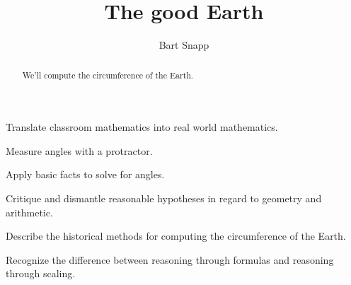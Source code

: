 \documentclass[noauthor,nooutcomes,handout]{ximera}
\title{The good Earth}
\author{Bart Snapp}
\begin{document}
\begin{abstract}
  We'll compute the circumference of the Earth.
\end{abstract}
\maketitle

\begin{listOutcomes}
\item Translate classroom mathematics into real world mathematics. 
\item Measure angles with a protractor.
\item Apply basic facts to solve for angles.
\item Critique and dismantle reasonable hypotheses in regard to geometry and arithmetic.
\item Describe the historical methods for computing the circumference
    of the Earth.
  \item Recognize the difference between reasoning through formulas
    and reasoning through scaling.
\end{listOutcomes}
\mynewpage
\end{document}
